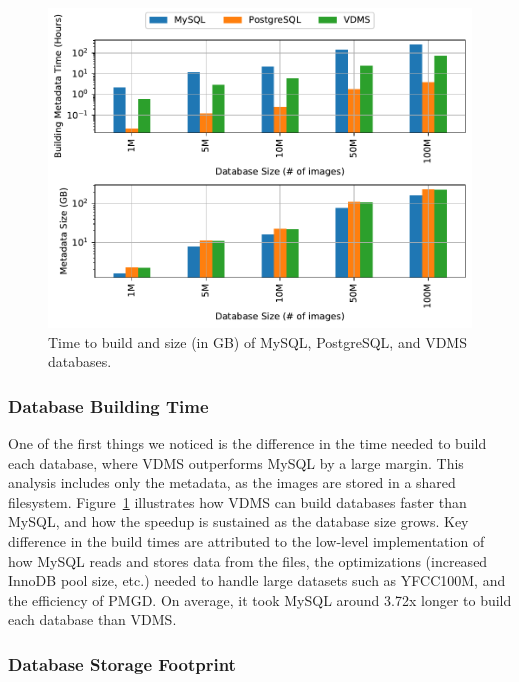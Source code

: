 \begin{figure}[ht]
\centering
\includegraphics[width=\columnwidth]{figures/all_build_times_plot}
\caption{Time to build and size (in GB) of MySQL, PostgreSQL, and VDMS databases.}
\label{fig:db_time_size}
\end{figure}

\subsubsection{Database Building Time}

One of the first things we noticed is the difference in the time needed to
build each database, where VDMS outperforms MySQL by a large margin.
This analysis includes only the metadata, as the images are stored
in a shared filesystem. Figure~\ref{fig:db_time_size} illustrates how
VDMS can build databases faster than MySQL, and how the speedup
is sustained as the database size grows.
Key difference in the build times are attributed to the low-level
implementation of how MySQL reads and stores data from the files, the
optimizations (increased InnoDB pool size, etc.) needed
to handle large datasets such as YFCC100M, and the efficiency of PMGD.
On average, it took MySQL around 3.72x longer to build each database than VDMS.

\subsubsection{Database Storage Footprint}


